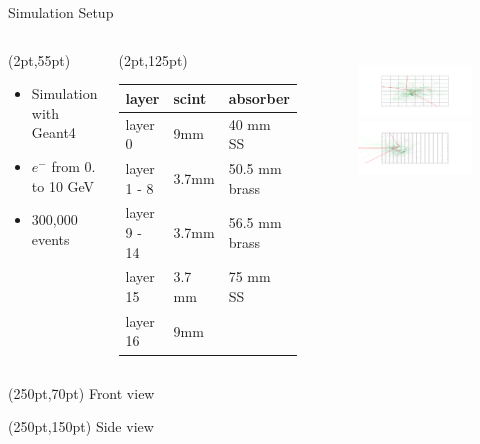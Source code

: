 \documentclass[10pt]{beamer}
\begin{document}
\begin{frame}{Simulation Setup}
  \begin{columns}
    \begin{textblock*}{150pt}(2pt,55pt)
      \begin{itemize}
      \item Simulation with Geant4\small{}
      \item $e^-$ from 0. to 10 GeV
      \item 300,000 events
      \end{itemize}
    \end{textblock*}
    \begin{textblock*}{10pt}(2pt,125pt)
      \begin{tabular}{l|l|l}
        layer  & scint    & absorber \\ \hline
        layer 0      & 9mm     & 40 mm SS\\
        layer 1 - 8  & 3.7mm   & 50.5 mm brass \\
        layer 9 - 14 & 3.7mm   & 56.5 mm brass \\
        layer 15     & 3.7 mm  & 75 mm SS \\
        layer 16     & 9mm     &                      
      \end{tabular}
    \end{textblock*}
    \begin{figure}[htp]
      \includegraphics[width=1.1\textwidth]{front.png}\\
      \includegraphics[width=1.1\textwidth]{side.png}
    \end{figure}
  \end{columns}
  \begin{textblock*}{100pt}(250pt,70pt)
    Front view
  \end{textblock*}
  \begin{textblock*}{100pt}(250pt,150pt)
    Side view
  \end{textblock*}
\end{frame}
\end{document}
